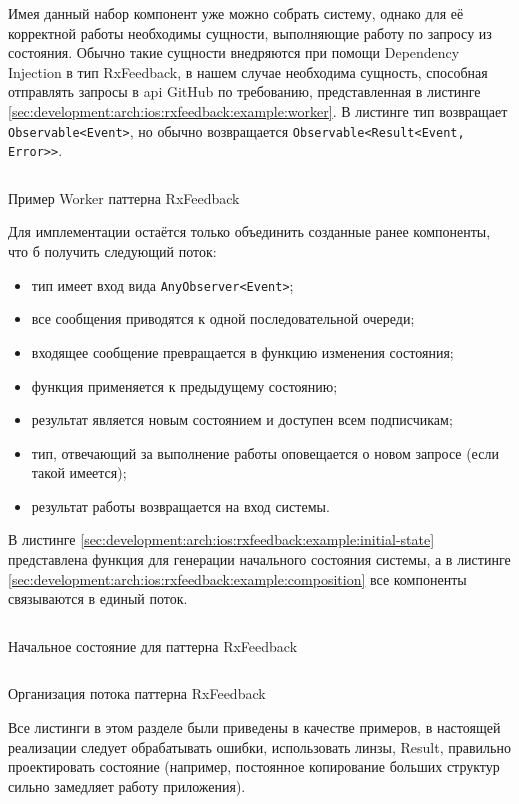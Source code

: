Имея данный набор компонент уже можно собрать систему, однако для её корректной работы необходимы сущности, выполняющие работу по запросу из состояния. Обычно такие сущности внедряются при помощи Dependency Injection в тип RxFeedback, в нашем случае необходима сущность, способная отправлять запросы в \gls{api} GitHub по требованию, представленная в листинге \ref{sec:development:arch:ios:rxfeedback:example:worker}. В листинге тип возвращает \texttt{Observable<Event>}, но обычно возвращается \texttt{Observable<Result<Event, Error>>}.

\begin{code}
  \inputminted{swift}{inc/src/rx-feedback-worker.swift}
   \caption{Пример Worker паттерна RxFeedback}
   \label{sec:development:arch:ios:rxfeedback:example:worker}
\end{code}

Для имплементации остаётся только объединить созданные ранее компоненты, что б получить следующий поток:

\begin{itemize}
  \item тип имеет вход вида \texttt{AnyObserver<Event>};
  \item все сообщения приводятся к одной последовательной очереди;
  \item входящее сообщение превращается в функцию изменения состояния;
  \item функция применяется к предыдущему состоянию;
  \item результат является новым состоянием и доступен всем подписчикам;
  \item тип, отвечающий за выполнение работы оповещается о новом запросе (если такой имеется);
  \item результат работы возвращается на вход системы.
\end{itemize}

В листинге \ref{sec:development:arch:ios:rxfeedback:example:initial-state} представлена функция для генерации начального состояния системы, а в листинге \ref{sec:development:arch:ios:rxfeedback:example:composition} все компоненты связываются в единый поток.

\begin{code}
  \inputminted{swift}{inc/src/rx-feedback-initial-state.swift}
   \caption{Начальное состояние для паттерна RxFeedback}
   \label{sec:development:arch:ios:rxfeedback:example:initial-state}
\end{code}

\begin{code}
  \inputminted{swift}{inc/src/rx-feedback-composition.swift}
   \caption{Организация потока паттерна RxFeedback}
   \label{sec:development:arch:ios:rxfeedback:example:composition}
\end{code}

Все листинги в этом разделе были приведены в качестве примеров, в настоящей реализации следует обрабатывать ошибки, использовать линзы, Result, правильно проектировать состояние (например, постоянное копирование больших структур сильно замедляет работу приложения).

\FloatBarrier
